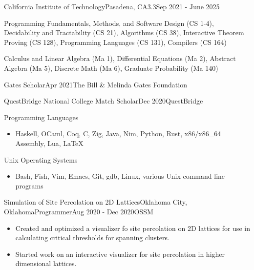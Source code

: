 \documentclass[a4paper]{article}
\begin{document}

    \begin{school}{California Institute of Technology}{Pasadena, CA}{3.3}{Sep 2021 - June 2025}
        \item Programming Fundamentals, Methods, and Software Design (CS 1-4), Decidability and Tractability (CS 21), Algorithms (CS 38), Interactive Theorem Proving (CS 128), Programming Languages (CS 131), Compilers (CS 164)
        \item Calculus and Linear Algebra (Ma 1), Differential Equations (Ma 2), Abstract Algebra (Ma 5), Discrete Math (Ma 6), Graduate Probability (Ma 140)
    \end{school}
    \begin{award*}{Gates Scholar}{Apr 2021}{The Bill \& Melinda Gates Foundation}
    \end{award*}
    \begin{award*}{QuestBridge National College Match Scholar}{Dec 2020}{QuestBridge}
    \end{award*}

    \begin{skill}{Programming Languages}
      \begin{itemize}[nosep]
        \item Haskell, OCaml, Coq, C, Zig, Java, Nim, Python, Rust, x86/x86\_64 Assembly, Lua, \LaTeX
      \end{itemize}
    \end{skill}
    \begin{skill}{Unix Operating Systems}
      \begin{itemize}[nosep]
        \item Bash, Fish, Vim, Emacs, Git, gdb, Linux, various Unix command line programs
     \end{itemize}
    \end{skill}

    \begin{activity}{Simulation of Site Percolation on 2D Lattices}{Oklahoma City, Oklahoma}{Programmer}{Aug 2020 - Dec 2020}{OSSM}
      \begin{itemize}[topsep=5pt, partopsep=0pt, itemsep=-1pt]
        \item Created and optimized a visualizer fo site percolation on 2D lattices for use in calculating critical thresholds for spanning clusters.
        \item Started work on an interactive visualizer for site percolation in higher dimensional lattices.
      \end{itemize}
    \end{activity}
\end{document}
